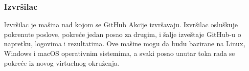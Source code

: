 \subsubsection{Izvršilac}
Izvršilac je mašina nad kojom se GitHub Akcije izvršavaju. Izvršilac osluškuje pokrenute poslove,
pokreće jedan posao za drugim, i šalje izveštaje GitHub-u o napretku, logovima i rezultatima. Ove 
mašine mogu da budu bazirane na Linux, Windows i macOS operativnim sistemima, a svaki posao 
unutar toka rada se pokreće iz novog virtuelnog okruženja.~\cite{GitHubActions}
